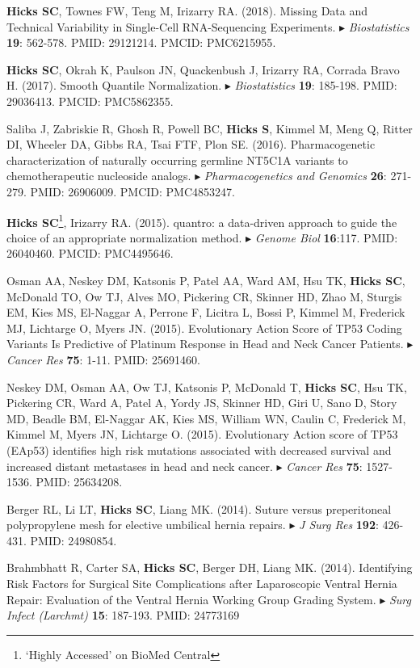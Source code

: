 \documentclass[10pt]{article}
\newcommand{\mine}{
  \addtocounter{enumi}{1}
\item[\fcolorbox{white}{grey}{\color{white} \tiny \arabic{enumi}}]
}
\newcommand{\dg}[1]{{\color{black} $\blacktriangleright$ {#1}}}
\begin{document}
\mine {\bf Hicks SC}, Townes FW, Teng M, Irizarry RA. (2018). Missing Data and Technical Variability in Single-Cell RNA-Sequencing Experiments. \dg{{\it Biostatistics} {\bf 19}: 562-578. PMID: 29121214. PMCID: PMC6215955}.
\mine {\bf Hicks SC}, Okrah K, Paulson JN, Quackenbush J, Irizarry RA, Corrada Bravo H. (2017). Smooth Quantile Normalization. \dg{{\it Biostatistics} {\bf 19}: 185-198. PMID: 29036413. PMCID: PMC5862355}.
\item Saliba J, Zabriskie R, Ghosh R, Powell BC, {\bf Hicks S}, Kimmel M, Meng Q, Ritter DI, Wheeler DA, Gibbs RA, Tsai FTF, Plon SE. (2016). Pharmacogenetic characterization of naturally occurring germline NT5C1A variants to chemotherapeutic nucleoside analogs. \dg{{\it Pharmacogenetics and Genomics}  {\bf 26}: 271-279. PMID: 26906009. PMCID: PMC4853247}.
\mine {\bf Hicks SC}\footnote{ `Highly Accessed' on BioMed Central}, Irizarry RA. (2015). quantro: a data-driven approach to guide the choice of an appropriate normalization method. \dg{{\it Genome Biol} {\bf 16}:117. PMID: 26040460. PMCID: PMC4495646}.
\item Osman AA, Neskey DM, Katsonis P, Patel AA, Ward AM, Hsu TK, {\bf Hicks SC}, McDonald TO, Ow TJ, Alves MO, Pickering CR, Skinner HD, Zhao M, Sturgis EM, Kies MS, El-Naggar A, Perrone F, Licitra L, Bossi P, Kimmel M, Frederick MJ, Lichtarge O, Myers JN. (2015). Evolutionary Action Score of TP53 Coding Variants Is Predictive of Platinum Response in Head and Neck Cancer Patients.\dg{{\it Cancer Res} {\bf 75}: 1-11. PMID: 25691460}.
\item Neskey DM, Osman AA, Ow TJ, Katsonis P, McDonald T, {\bf Hicks SC}, Hsu TK, Pickering CR, Ward A, Patel A, Yordy JS, Skinner HD, Giri U, Sano D, Story MD, Beadle BM, El-Naggar AK, Kies MS, William WN, Caulin C, Frederick M, Kimmel M, Myers JN, Lichtarge O. (2015). Evolutionary Action score of TP53 (EAp53) identifies high risk mutations associated with decreased survival and increased distant metastases in head and neck cancer. \dg{{\it Cancer Res} {\bf 75}: 1527-1536. PMID: 25634208}.
\item Berger RL, Li LT, {\bf Hicks SC}, Liang MK. (2014). Suture versus preperitoneal polypropylene mesh for elective umbilical hernia repairs. \dg{{\it J Surg Res} {\bf 192}: 426-431. PMID: 24980854}.
\item Brahmbhatt R, Carter SA, {\bf Hicks SC}, Berger DH, Liang MK. (2014). Identifying Risk Factors for Surgical Site Complications after Laparoscopic Ventral Hernia Repair: Evaluation of the Ventral Hernia Working Group Grading System. \dg{{\it Surg Infect (Larchmt)} {\bf 15}: 187-193. PMID: 24773169}
\end{document}
